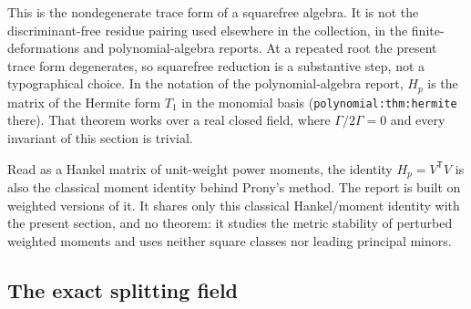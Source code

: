 \documentclass[11pt,a4paper]{article}
\numberwithin{equation}{section}
\theoremstyle{definition}
\theoremstyle{remark}
\begin{document}
This is the nondegenerate trace form of a squarefree algebra. It is not the
discriminant-free residue pairing used elsewhere in the collection, in the
finite-deformations and polynomial-algebra reports. At a repeated root the
present trace form degenerates, so squarefree reduction is a substantive
step, not a typographical choice. In the notation of the polynomial-algebra
report, $H_p$ is the matrix of the Hermite form $T_1$ in the monomial basis
(\texttt{polynomial:thm:hermite} there). That theorem works over a real
closed field, where $\Gamma/2\Gamma=0$ and every invariant of this section is
trivial.

Read as a Hankel matrix of unit-weight power moments, the identity
$H_p=V^{\mathsf T}V$ is also the classical moment identity behind Prony's
method. The report 
is built on weighted versions of it. It shares only this classical
Hankel/moment identity with the present section, and no theorem: it studies
the metric stability of perturbed weighted moments and uses neither square
classes nor leading principal minors.

\subsection{The exact splitting field}
\label{spec:hank:sub:field}
\end{document}
